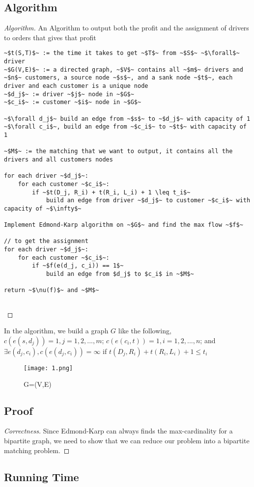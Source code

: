 \documentclass[openany]{article}
\begin{document}
\subsection*{Algorithm}
\begin{proof}[Algorithm]{}
		\renewcommand{\qedsymbol}{}
		An Algorithm to output both the profit and the assignment of drivers to orders that gives that profit
		\begin{lstlisting}[basicstyle=\fontsize{8}{9}\selectfont\ttfamily]
~$t(S,T)$~ := the time it takes to get ~$T$~ from ~$S$~ ~$\forall$~ driver
~$G(V,E)$~ := a directed graph, ~$V$~ contains all ~$m$~ drivers and ~$n$~ customers, a source node ~$s$~, and a sank node ~$t$~, each driver and each customer is a unique node
~$d_j$~ := driver ~$j$~ node in ~$G$~
~$c_i$~ := customer ~$i$~ node in ~$G$~

~$\forall d_j$~ build an edge from ~$s$~ to ~$d_j$~ with capacity of 1
~$\forall c_i$~, build an edge from ~$c_i$~ to ~$t$~ with capacity of 1

~$M$~ := the matching that we want to output, it contains all the drivers and all customers nodes

for each driver ~$d_j$~:
    for each customer ~$c_i$~:
        if ~$t(D_j, R_i) + t(R_i, L_i) + 1 \leq t_i$~
            build an edge from driver ~$d_j$~ to customer ~$c_i$~ with capacity of ~$\infty$~

Implement Edmond-Karp algorithm on ~$G$~ and find the max flow ~$f$~

// to get the assignment
for each driver ~$d_j$~:
    for each customer ~$c_i$~:
        if ~$f(e(d_j, c_i)) == 1$~
            build an edge from $d_j$ to $c_i$ in ~$M$~
            
return ~$\nu(f)$~ and ~$M$~
        
		\end{lstlisting} 
\end{proof}

In the algorithm, we build a graph $G$ like the following, $c(e(s,d_j)) = 1, j=1,2,...,m$; $c(e(c_i,t)) = 1, i = 1,2,...,n$; and $\exists e(d_j, c_i), c(e(d_j,c_i)) = \infty$ if $t(D_j,R_i)+t(R_i,L_i)+1 \leq t_i$
\begin{figure}[htp]
    \centering
    \texttt{[image: 1.png]}
    \caption{G=(V,E)}
    \label{fig:galaxy}
\end{figure}

\subsection*{Proof}
\begin{proof}[Correctness]{}
    Since Edmond-Karp can always finds the max-cardinality for a bipartite graph, we need to show that we can reduce our problem into a bipartite matching problem.
\end{proof}

\subsection*{Running Time}
\end{document}
